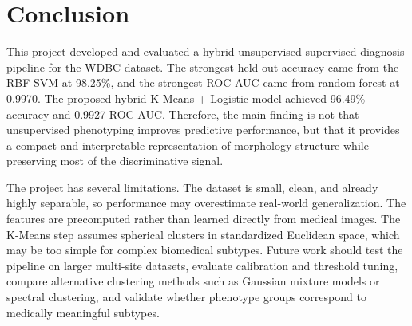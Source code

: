 \documentclass{article}
\begin{document}
\section{Conclusion}

This project developed and evaluated a hybrid unsupervised-supervised diagnosis pipeline for the WDBC dataset. The
strongest held-out accuracy came from the RBF SVM at 98.25\%, and the strongest ROC-AUC came from random forest
at 0.9970. The proposed hybrid K-Means + Logistic model achieved 96.49\% accuracy and 0.9927 ROC-AUC. Therefore,
the main finding is not that unsupervised phenotyping improves predictive performance, but that it provides a compact and
interpretable representation of morphology structure while preserving most of the discriminative signal.

The project has several limitations. The dataset is small, clean, and already highly separable, so performance may
overestimate real-world generalization. The features are precomputed rather than learned directly from medical images. The
K-Means step assumes spherical clusters in standardized Euclidean space, which may be too simple for complex biomedical
subtypes. Future work should test the pipeline on larger multi-site datasets, evaluate calibration and threshold tuning, compare
alternative clustering methods such as Gaussian mixture models or spectral clustering, and validate whether phenotype groups
correspond to medically meaningful subtypes.



\end{document}
